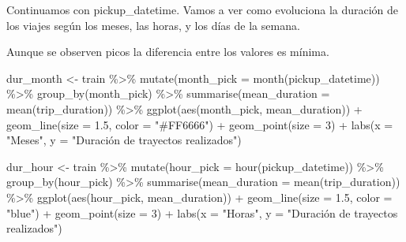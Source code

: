 \documentclass[
]{article}
\newenvironment{Shaded}{\begin{snugshade}}{\end{snugshade}}
\newcommand{\AttributeTok}[1]{\textcolor[rgb]{0.77,0.63,0.00}{#1}}
\newcommand{\DecValTok}[1]{\textcolor[rgb]{0.00,0.00,0.81}{#1}}
\newcommand{\FloatTok}[1]{\textcolor[rgb]{0.00,0.00,0.81}{#1}}
\newcommand{\FunctionTok}[1]{\textcolor[rgb]{0.00,0.00,0.00}{#1}}
\newcommand{\NormalTok}[1]{#1}
\newcommand{\OtherTok}[1]{\textcolor[rgb]{0.56,0.35,0.01}{#1}}
\newcommand{\SpecialCharTok}[1]{\textcolor[rgb]{0.00,0.00,0.00}{#1}}
\newcommand{\StringTok}[1]{\textcolor[rgb]{0.31,0.60,0.02}{#1}}
\begin{document}
Continuamos con pickup\_datetime. Vamos a ver como evoluciona la
duración de los viajes según los meses, las horas, y los días de la
semana.

Aunque se observen picos la diferencia entre los valores es mínima.

\begin{Shaded}
\begin{Highlighting}[]
\NormalTok{dur\_month }\OtherTok{\textless{}{-}}\NormalTok{ train }\SpecialCharTok{\%\textgreater{}\%}
  \FunctionTok{mutate}\NormalTok{(}\AttributeTok{month\_pick =} \FunctionTok{month}\NormalTok{(pickup\_datetime)) }\SpecialCharTok{\%\textgreater{}\%}
  \FunctionTok{group\_by}\NormalTok{(month\_pick) }\SpecialCharTok{\%\textgreater{}\%}
  \FunctionTok{summarise}\NormalTok{(}\AttributeTok{mean\_duration =} \FunctionTok{mean}\NormalTok{(trip\_duration)) }\SpecialCharTok{\%\textgreater{}\%}
  \FunctionTok{ggplot}\NormalTok{(}\FunctionTok{aes}\NormalTok{(month\_pick, mean\_duration)) }\SpecialCharTok{+}
  \FunctionTok{geom\_line}\NormalTok{(}\AttributeTok{size =} \FloatTok{1.5}\NormalTok{, }\AttributeTok{color =} \StringTok{"\#FF6666"}\NormalTok{) }\SpecialCharTok{+}
  \FunctionTok{geom\_point}\NormalTok{(}\AttributeTok{size =} \DecValTok{3}\NormalTok{) }\SpecialCharTok{+} 
  \FunctionTok{labs}\NormalTok{(}\AttributeTok{x =} \StringTok{"Meses"}\NormalTok{, }\AttributeTok{y =} \StringTok{"Duración de trayectos realizados"}\NormalTok{)}

\NormalTok{dur\_hour }\OtherTok{\textless{}{-}}\NormalTok{ train }\SpecialCharTok{\%\textgreater{}\%}
  \FunctionTok{mutate}\NormalTok{(}\AttributeTok{hour\_pick =} \FunctionTok{hour}\NormalTok{(pickup\_datetime)) }\SpecialCharTok{\%\textgreater{}\%}
  \FunctionTok{group\_by}\NormalTok{(hour\_pick) }\SpecialCharTok{\%\textgreater{}\%}
  \FunctionTok{summarise}\NormalTok{(}\AttributeTok{mean\_duration =} \FunctionTok{mean}\NormalTok{(trip\_duration)) }\SpecialCharTok{\%\textgreater{}\%}
  \FunctionTok{ggplot}\NormalTok{(}\FunctionTok{aes}\NormalTok{(hour\_pick, mean\_duration)) }\SpecialCharTok{+}
  \FunctionTok{geom\_line}\NormalTok{(}\AttributeTok{size =} \FloatTok{1.5}\NormalTok{, }\AttributeTok{color =} \StringTok{"blue"}\NormalTok{) }\SpecialCharTok{+}
  \FunctionTok{geom\_point}\NormalTok{(}\AttributeTok{size =} \DecValTok{3}\NormalTok{) }\SpecialCharTok{+} 
  \FunctionTok{labs}\NormalTok{(}\AttributeTok{x =} \StringTok{"Horas"}\NormalTok{, }\AttributeTok{y =} \StringTok{"Duración de trayectos realizados"}\NormalTok{)}


\end{Highlighting}
\end{Shaded}
\end{document}
